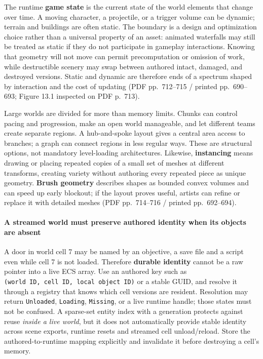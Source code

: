 The runtime \textbf{game state} is the current state of the world elements that change over time. A moving character, a projectile, or a trigger volume can be dynamic; terrain and buildings are often static. The boundary is a design and optimization choice rather than a universal property of an asset: animated waterfalls may still be treated as static if they do not participate in gameplay interactions. Knowing that geometry will not move can permit precomputation or omission of work, while destructible scenery may swap between authored intact, damaged, and destroyed versions. Static and dynamic are therefore ends of a spectrum shaped by interaction and the cost of updating (PDF pp.~712--715 / printed pp.~690--693; Figure 13.1 inspected on PDF p.~713).

Large worlds are divided for more than memory limits. Chunks can control pacing and progression, make an open world manageable, and let different teams create separate regions. A hub-and-spoke layout gives a central area access to branches; a graph can connect regions in less regular ways. These are structural options, not mandatory level-loading architectures. Likewise, \textbf{instancing} means drawing or placing repeated copies of a small set of meshes at different transforms, creating variety without authoring every repeated piece as unique geometry. \textbf{Brush geometry} describes shapes as bounded convex volumes and can speed up early blockout; if the layout proves useful, artists can refine or replace it with detailed meshes (PDF pp.~714--716 / printed pp.~692--694).

\paragraph{A streamed world must preserve authored identity when its objects are absent}\label{a-streamed-world-must-preserve-authored-identity-when-its-objects-are-absent}

A door in world cell 7 may be named by an objective, a save file and a script even while cell 7 is not loaded. Therefore \textbf{durable identity} cannot be a raw pointer into a live ECS array. Use an authored key such as \texttt{(world\ ID,\ cell\ ID,\ local\ object\ ID)} or a stable GUID, and resolve it through a registry that knows which cell versions are resident. Resolution may return \texttt{Unloaded}, \texttt{Loading}, \texttt{Missing}, or a live runtime handle; those states must not be confused. A sparse-set entity index with a generation protects against reuse \emph{inside a live world}, but it does not automatically provide stable identity across scene exports, runtime resets and streamed cell unload/reload. Store the authored-to-runtime mapping explicitly and invalidate it before destroying a cell's memory.

